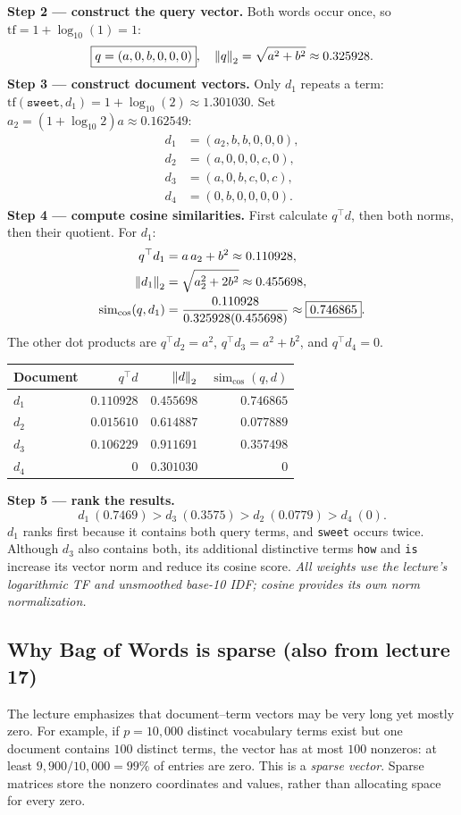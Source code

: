 \textbf{Step 2 --- construct the query vector.} Both words occur once, so $\mathrm{tf}=1+\log_{10}(1)=1$:
\[
\boxed{q=(a,0,b,0,0,0)},\quad
\left\lVert q\right\rVert_2=\sqrt{a^2+b^2}\approx0.325928.
\]
\textbf{Step 3 --- construct document vectors.} Only $d_1$ repeats a term: $\mathrm{tf}(\texttt{sweet},d_1)=1+\log_{10}(2)\approx1.301030$. Set $a_2=(1+\log_{10}2)a\approx0.162549$:
\[
\begin{aligned}
d_1&=(a_2,b,b,0,0,0),\\
d_2&=(a,0,0,0,c,0),\\
d_3&=(a,0,b,c,0,c),\\
d_4&=(0,b,0,0,0,0).
\end{aligned}
\]
\textbf{Step 4 --- compute cosine similarities.} First calculate $q^\top d$, then both norms, then their quotient. For $d_1$:
\[
\begin{aligned}
q^\top d_1&=a\,a_2+b^2\approx0.110928,\\
\left\lVert d_1\right\rVert_2&=\sqrt{a_2^2+2b^2}\approx0.455698,\\
\operatorname{sim}_{\cos}(q,d_1)&=\frac{0.110928}{0.325928(0.455698)}\approx\boxed{0.746865}.
\end{aligned}
\]
The other dot products are $q^\top d_2=a^2$, $q^\top d_3=a^2+b^2$, and $q^\top d_4=0$.
\begin{center}\small
\begin{tabular}{@{}lrrr@{}}\toprule
Document & $q^\top d$ & $\left\lVert d\right\rVert_2$ & $\operatorname{sim}_{\cos}(q,d)$\\\midrule
$d_1$ & $0.110928$ & $0.455698$ & $\mathbf{0.746865}$\\
$d_2$ & $0.015610$ & $0.614887$ & $0.077889$\\
$d_3$ & $0.106229$ & $0.911691$ & $0.357498$\\
$d_4$ & $0$ & $0.301030$ & $0$\\\bottomrule
\end{tabular}\end{center}
\textbf{Step 5 --- rank the results.}
\[
\boxed{d_1\ (0.7469)>d_3\ (0.3575)>d_2\ (0.0779)>d_4\ (0)}.
\]
$d_1$ ranks first because it contains both query terms, and \texttt{sweet} occurs twice. Although $d_3$ also contains both, its additional distinctive terms \texttt{how} and \texttt{is} increase its vector norm and reduce its cosine score. \emph{All weights use the lecture's logarithmic TF and unsmoothed base-10 IDF; cosine provides its own norm normalization.}

\subsection*{Why Bag of Words is sparse (also from lecture 17)}
The lecture emphasizes that document--term vectors may be very long yet mostly zero. For example, if $p=10{,}000$ distinct vocabulary terms exist but one document contains $100$ distinct terms, the vector has at most $100$ nonzeros: at least $9{,}900/10{,}000=99\%$ of entries are zero. This is a \emph{sparse vector}. Sparse matrices store the nonzero coordinates and values, rather than allocating space for every zero.
